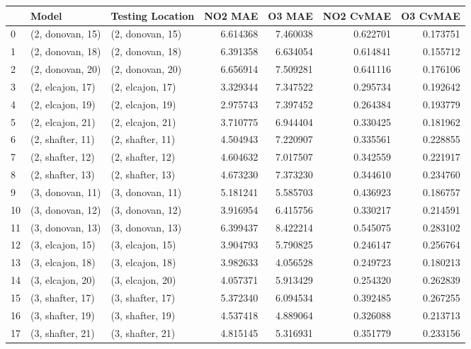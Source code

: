 \begin{tabular}{lllrrrr}
\toprule
{} &             Model &  Testing Location &   NO2 MAE &    O3 MAE &  NO2 CvMAE &  O3 CvMAE \\
\midrule
0  &  (2, donovan, 15) &  (2, donovan, 15) &  6.614368 &  7.460038 &   0.622701 &  0.173751 \\
1  &  (2, donovan, 18) &  (2, donovan, 18) &  6.391358 &  6.634054 &   0.614841 &  0.155712 \\
2  &  (2, donovan, 20) &  (2, donovan, 20) &  6.656914 &  7.509281 &   0.641116 &  0.176106 \\
3  &  (2, elcajon, 17) &  (2, elcajon, 17) &  3.329344 &  7.347522 &   0.295734 &  0.192642 \\
4  &  (2, elcajon, 19) &  (2, elcajon, 19) &  2.975743 &  7.397452 &   0.264384 &  0.193779 \\
5  &  (2, elcajon, 21) &  (2, elcajon, 21) &  3.710775 &  6.944404 &   0.330425 &  0.181962 \\
6  &  (2, shafter, 11) &  (2, shafter, 11) &  4.504943 &  7.220907 &   0.335561 &  0.228855 \\
7  &  (2, shafter, 12) &  (2, shafter, 12) &  4.604632 &  7.017507 &   0.342559 &  0.221917 \\
8  &  (2, shafter, 13) &  (2, shafter, 13) &  4.673230 &  7.373230 &   0.344610 &  0.234760 \\
9  &  (3, donovan, 11) &  (3, donovan, 11) &  5.181241 &  5.585703 &   0.436923 &  0.186757 \\
10 &  (3, donovan, 12) &  (3, donovan, 12) &  3.916954 &  6.415756 &   0.330217 &  0.214591 \\
11 &  (3, donovan, 13) &  (3, donovan, 13) &  6.399437 &  8.422214 &   0.545075 &  0.283102 \\
12 &  (3, elcajon, 15) &  (3, elcajon, 15) &  3.904793 &  5.790825 &   0.246147 &  0.256764 \\
13 &  (3, elcajon, 18) &  (3, elcajon, 18) &  3.982633 &  4.056528 &   0.249723 &  0.180213 \\
14 &  (3, elcajon, 20) &  (3, elcajon, 20) &  4.057371 &  5.913429 &   0.254320 &  0.262839 \\
15 &  (3, shafter, 17) &  (3, shafter, 17) &  5.372340 &  6.094534 &   0.392485 &  0.267255 \\
16 &  (3, shafter, 19) &  (3, shafter, 19) &  4.537418 &  4.889064 &   0.326088 &  0.213713 \\
17 &  (3, shafter, 21) &  (3, shafter, 21) &  4.815145 &  5.316931 &   0.351779 &  0.233156 \\

\end{tabular}
